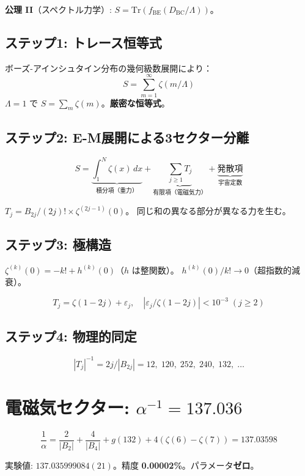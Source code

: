\documentclass[11pt,a4paper]{article}
\newcommand{\Tr}{\mathrm{Tr}}
\begin{document}
\noindent\textbf{公理 II}（スペクトル力学）:
$S = \Tr(f_{\mathrm{BE}}(D_{\mathrm{BC}}/\Lambda))$。

\subsection{ステップ1: トレース恒等式}

ボーズ-アインシュタイン分布の幾何級数展開により：
$$S = \sum_{m=1}^{\infty}\zeta(m/\Lambda)$$
$\Lambda=1$ で $S=\sum_m\zeta(m)$。\textbf{厳密な恒等式}。

\subsection{ステップ2: E-M展開による3セクター分離}

$$S = \underbrace{\int_1^N\zeta(x)\,dx}_{\text{積分項（重力）}}
+ \underbrace{\sum_{j\geq 1}T_j}_{\text{有限項（電磁気力）}}
+ \underbrace{\text{発散項}}_{\text{宇宙定数}}$$

$T_j = B_{2j}/(2j)! \times \zeta^{(2j-1)}(0)$。
同じ和の異なる部分が異なる力を生む。

\subsection{ステップ3: 極構造}

$\zeta^{(k)}(0) = -k! + h^{(k)}(0)$（$h$ は整関数）。
$h^{(k)}(0)/k! \to 0$（超指数的減衰）。

$$T_j = \zeta(1-2j) + \varepsilon_j, \quad |\varepsilon_j/\zeta(1-2j)| < 10^{-3} \;(j \geq 2)$$

\subsection{ステップ4: 物理的同定}

$$|T_j|^{-1} = 2j/|B_{2j}| = 12,\;120,\;252,\;240,\;132,\;\ldots$$

\section{電磁気セクター: $\alpha^{-1} = 137.036$}

$$\frac{1}{\alpha} = \frac{2}{|B_2|} + \frac{4}{|B_4|} + g(132) + 4(\zeta(6)-\zeta(7)) = 137.03598$$

実験値: $137.035999084(21)$。精度 \textbf{0.00002\%}。パラメータ\textbf{ゼロ}。
\end{document}
